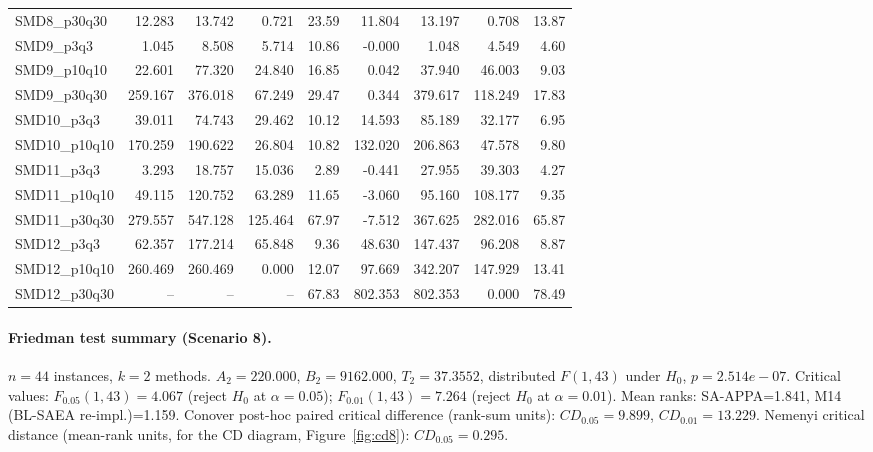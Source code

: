 \begin{longtable}{lrrrrrrrr}
SMD8\_p30q30 & 12.283 & 13.742 & 0.721 & 23.59 & 11.804 & 13.197 & 0.708 & 13.87 \\
SMD9\_p3q3 & 1.045 & 8.508 & 5.714 & 10.86 & -0.000 & 1.048 & 4.549 & 4.60 \\
SMD9\_p10q10 & 22.601 & 77.320 & 24.840 & 16.85 & 0.042 & 37.940 & 46.003 & 9.03 \\
SMD9\_p30q30 & 259.167 & 376.018 & 67.249 & 29.47 & 0.344 & 379.617 & 118.249 & 17.83 \\
SMD10\_p3q3 & 39.011 & 74.743 & 29.462 & 10.12 & 14.593 & 85.189 & 32.177 & 6.95 \\
SMD10\_p10q10 & 170.259 & 190.622 & 26.804 & 10.82 & 132.020 & 206.863 & 47.578 & 9.80 \\
SMD11\_p3q3 & 3.293 & 18.757 & 15.036 & 2.89 & -0.441 & 27.955 & 39.303 & 4.27 \\
SMD11\_p10q10 & 49.115 & 120.752 & 63.289 & 11.65 & -3.060 & 95.160 & 108.177 & 9.35 \\
SMD11\_p30q30 & 279.557 & 547.128 & 125.464 & 67.97 & -7.512 & 367.625 & 282.016 & 65.87 \\
SMD12\_p3q3 & 62.357 & 177.214 & 65.848 & 9.36 & 48.630 & 147.437 & 96.208 & 8.87 \\
SMD12\_p10q10 & 260.469 & 260.469 & 0.000 & 12.07 & 97.669 & 342.207 & 147.929 & 13.41 \\
SMD12\_p30q30 & -- & -- & -- & 67.83 & 802.353 & 802.353 & 0.000 & 78.49 \\
\end{longtable}
\endgroup

\paragraph{Friedman test summary (Scenario 8).}
$n=44$ instances, $k=2$ methods. $A_2=220.000$, $B_2=9162.000$, $T_2=37.3552$, distributed $F(1,43)$ under $H_0$, $p=2.514e-07$. Critical values: $F_{0.05}(1,43)=4.067$ (reject $H_0$ at $\alpha=0.05$); $F_{0.01}(1,43)=7.264$ (reject $H_0$ at $\alpha=0.01$). Mean ranks: SA-APPA=1.841, M14 (BL-SAEA re-impl.)=1.159. Conover post-hoc paired critical difference (rank-sum units): $CD_{0.05}=9.899$, $CD_{0.01}=13.229$. Nemenyi critical distance (mean-rank units, for the CD diagram, Figure~\ref{fig:cd8}): $CD_{0.05}=0.295$.
